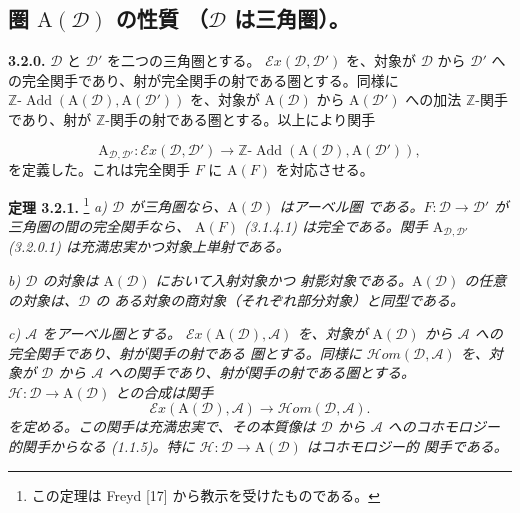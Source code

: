 \clearpage
{}%
\begingroup
\small
\setlength{\parskip}{0pt}%
\setlength{\emergencystretch}{1.5em}%

\subsection{圏 \texorpdfstring{$\mathrm A(\mathcal D)$}{A(D)} の性質
  （\texorpdfstring{$\mathcal D$}{D} は三角圏）。}

\noindent\textbf{3.2.0.}\quad
$\mathcal D$ と $\mathcal D'$ を二つの三角圏とする。
$\mathcal E x(\mathcal D,\mathcal D')$ を、対象が $\mathcal D$ から
$\mathcal D'$ への完全関手であり、射が完全関手の射である圏とする。同様に
$\mathbb Z\text{-}\operatorname{Add}(\mathrm A(\mathcal D),
\mathrm A(\mathcal D'))$ を、対象が $\mathrm A(\mathcal D)$ から
$\mathrm A(\mathcal D')$ への加法 $\mathbb Z$-関手であり、射が
$\mathbb Z$-関手の射である圏とする。以上により関手

\[
\mathrm A_{\mathcal D,\mathcal D'}\colon
\mathcal E x(\mathcal D,\mathcal D')
\longrightarrow
\mathbb Z\text{-}\operatorname{Add}
(\mathrm A(\mathcal D),\mathrm A(\mathcal D')),
\tag{3.2.0.1}
\]
を定義した。これは完全関手 $F$ に $\mathrm A(F)$ を対応させる。

\medskip
\noindent\textbf{定理 3.2.1.}\begingroup\renewcommand{\thefootnote}{(*)}%
\footnote{この定理は Freyd [17] から教示を受けたものである。}\endgroup\quad
\textit{a) $\mathcal D$ が三角圏なら、$\mathrm A(\mathcal D)$ はアーベル圏
である。$F\colon\mathcal D\to\mathcal D'$ が三角圏の間の完全関手なら、
$\mathrm A(F)$ (3.1.4.1) は完全である。関手
$\mathrm A_{\mathcal D,\mathcal D'}$ (3.2.0.1) は充満忠実かつ対象上単射である。}

\textit{b) $\mathcal D$ の対象は $\mathrm A(\mathcal D)$ において入射対象かつ
射影対象である。$\mathrm A(\mathcal D)$ の任意の対象は、$\mathcal D$ の
ある対象の商対象（それぞれ部分対象）と同型である。}

\textit{c) $\mathcal A$ をアーベル圏とする。
$\mathcal E x(\mathrm A(\mathcal D),\mathcal A)$ を、対象が
$\mathrm A(\mathcal D)$ から $\mathcal A$ への完全関手であり、射が関手の射である
圏とする。同様に $\mathcal H\!om(\mathcal D,\mathcal A)$ を、対象が
$\mathcal D$ から $\mathcal A$ への関手であり、射が関手の射である圏とする。
$\mathcal H\colon\mathcal D\to\mathrm A(\mathcal D)$ との合成は関手}
\[
\mathcal E x(\mathrm A(\mathcal D),\mathcal A)
\longrightarrow
\mathcal H\!om(\mathcal D,\mathcal A).
\]
\textit{を定める。この関手は充満忠実で、その本質像は $\mathcal D$ から
$\mathcal A$ へのコホモロジー的関手からなる (1.1.5)。特に
$\mathcal H\colon\mathcal D\to\mathrm A(\mathcal D)$ はコホモロジー的
関手である。}

